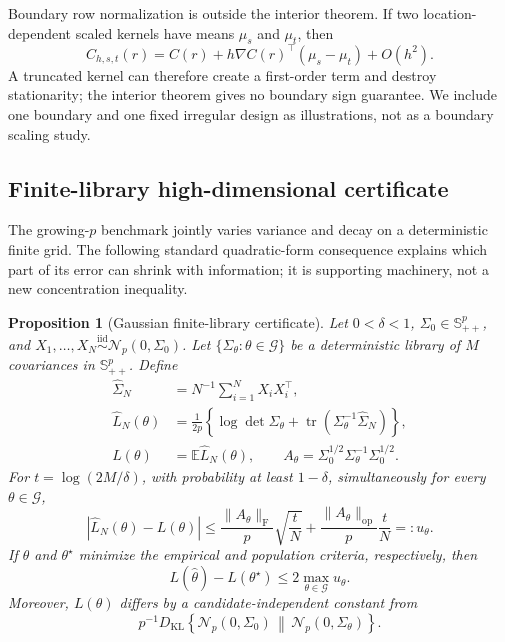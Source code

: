 \documentclass[sigconf]{acmart}
\newtheorem{proposition}{Proposition}
\theoremstyle{remark}
\newcommand{\E}{\mathbb E}
\newcommand{\tr}{\operatorname{tr}}
\newcommand{\KL}{D_{\mathrm{KL}}}
\newcommand{\Normal}{\mathcal N}
\begin{document}
Boundary row normalization is outside the interior theorem. If two
location-dependent scaled kernels have means \(\mu_s\) and \(\mu_t\), then
\[
C_{h,s,t}(r)=C(r)+h\nabla C(r)^\top(\mu_s-\mu_t)+O(h^2).
\]
A truncated kernel can therefore create a first-order term and destroy
stationarity; the interior theorem gives no boundary sign guarantee. We include
one boundary and one fixed irregular design as illustrations, not as a boundary
scaling study.

\subsection{Finite-library high-dimensional certificate}

The growing-\(p\) benchmark jointly varies variance and decay on a deterministic
finite grid. The following standard quadratic-form consequence explains which
part of its error can shrink with information; it is supporting machinery, not
a new concentration inequality.

\begin{proposition}[Gaussian finite-library certificate]
\label{prop:certificate}
Let \(0<\delta<1\),
\(\Sigma_0\in\mathbb S_{++}^p\), and
\(X_1,\ldots,X_N\overset{\mathrm{iid}}\sim \Normal_p(0,\Sigma_0)\). Let
\(\{\Sigma_\theta:\theta\in\mathcal G\}\) be a deterministic library of
\(M\) covariances in \(\mathbb S_{++}^p\). Define
\begin{align}
 \widehat\Sigma_N&=N^{-1}\sum_{i=1}^N X_iX_i^\top,\\
 \widehat L_N(\theta)&=\frac1{2p}\left\{\log\det\Sigma_\theta+
 \tr(\Sigma_\theta^{-1}\widehat\Sigma_N)\right\},
 \label{eq:empiricalrisk}\\
 L(\theta)&=\E\widehat L_N(\theta),\qquad
 A_\theta=\Sigma_0^{1/2}\Sigma_\theta^{-1}\Sigma_0^{1/2}.
\end{align}
For \(t=\log(2M/\delta)\), with probability at least \(1-\delta\),
simultaneously for every \(\theta\in\mathcal G\),
\begin{equation}
 |\widehat L_N(\theta)-L(\theta)|\leq
 \frac{\lVert A_\theta\rVert_{\mathrm F}}{p}\sqrt{\frac tN}
 +\frac{\lVert A_\theta\rVert_{\mathrm{op}}}p\frac tN
 =:u_\theta.
 \label{eq:certificate}
\end{equation}
If \(\widehat\theta\) and \(\theta^\star\) minimize the empirical and
population criteria, respectively, then
\begin{equation}
 L(\widehat\theta)-L(\theta^\star)
 \leq2\max_{\theta\in\mathcal G}u_\theta.
 \label{eq:erm}
\end{equation}
Moreover, \(L(\theta)\) differs by a candidate-independent constant from
\begin{equation}
 p^{-1}\KL\!\left\{\Normal_p(0,\Sigma_0)\,\middle\|\,
 \Normal_p(0,\Sigma_\theta)\right\}.
\end{equation}
\end{proposition}
\end{document}
